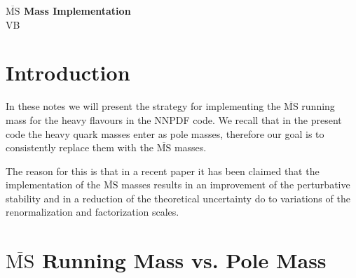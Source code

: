 \documentclass[10pt,a4paper]{article}
\begin{document}
\begin{center}
\textbf{\Large $\overline{\mbox{MS}}$ Mass Implementation}\\
{\large VB}
\end{center}

\tableofcontents

\newpage

\section{Introduction}

In these notes we will present the strategy for implementing the $\overline{\mbox{MS}}$ running mass for the heavy flavours in the NNPDF code. We recall that in the present code the heavy quark masses enter as pole masses, therefore our goal is to consistently replace them with the $\overline{\mbox{MS}}$ masses.

The reason for this is that in a recent paper \cite{Alekhin:2010sv} it has been claimed that the implementation of the $\overline{\mbox{MS}}$ masses results in an improvement of the perturbative stability and in a reduction of the theoretical uncertainty do to variations of the renormalization and factorization scales.

\section{$\overline{\mbox{MS}}$ Running Mass vs. Pole Mass}
\end{document}
